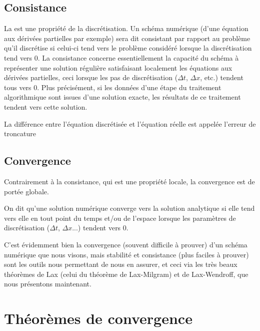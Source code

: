 \medskip
\subsection{Consistance}
La  est une propriété de la discrétisation. Un schéma numérique (d'une équation aux dérivées partielles par exemple) sera dit consistant par rapport au problème qu'il discrétise si celui-ci tend vers le problème considéré lorsque la discrétisation tend vers 0. La consistance concerne essentiellement la capacité du schéma à représenter une solution régulière satisfaisant localement les équations aux dérivées partielles, ceci lorsque les pas de discrétisation ($\Delta t$, $\Delta x$, etc.) tendent tous vers 0. Plus précisément, si les données d'une étape du traitement algorithmique sont issues d'une solution exacte, les résultats de ce traitement tendent vers cette solution.

La différence entre l'équation discrétisée et l'équation réelle est appelée l'erreur de troncature

\medskip
{}

\medskip
\subsection{Convergence}
Contrairement à la consistance, qui est une propriété locale, la convergence est de portée globale.

On dit qu'une solution numérique converge vers la solution analytique si elle tend vers elle en tout point du temps et/ou de l'espace lorsque les paramètres de discrétisation ($\Delta t$, $\Delta x$...) tendent vers 0.

\medskip
C'est évidemment bien la convergence (souvent difficile à prouver) d'un schéma numérique que nous visons, mais stabilité et consistance (plus faciles à prouver) sont les outils nous permettant de nous en assurer, et ceci via les très beaux théorèmes de Lax (celui du théorème de Lax-Milgram) et de Lax-Wendroff, que nous présentons maintenant.


\medskip
\section{Théorèmes de convergence}

